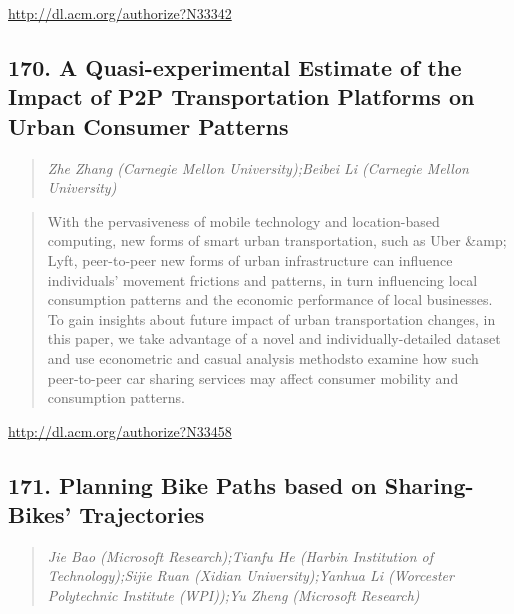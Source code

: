 \documentclass{article}
\begin{document}
\href{http://dl.acm.org/authorize?N33342}{http://dl.acm.org/authorize?N33342}

\subsection{170. A Quasi-experimental Estimate of the Impact of P2P Transportation Platforms on Urban Consumer Patterns}

\begin{quote}
\footnotesize{\textit{Zhe Zhang (Carnegie Mellon University);Beibei Li (Carnegie Mellon University)}}

\end{quote}

\begin{quote}
With the pervasiveness of mobile technology and location-based computing, new forms of smart urban transportation, such as Uber \&amp; Lyft, peer-to-peer new forms of urban infrastructure can influence individuals’ movement frictions and patterns, in turn influencing local consumption patterns and the economic performance of local businesses. To gain insights about future impact of urban transportation changes, in this paper, we take advantage of a novel and individually-detailed dataset and use econometric and casual analysis methodsto examine how such peer-to-peer car sharing services may affect consumer mobility and consumption patterns.
\end{quote}

\href{http://dl.acm.org/authorize?N33458}{http://dl.acm.org/authorize?N33458}

\subsection{171. Planning Bike Paths based on Sharing-Bikes' Trajectories}

\begin{quote}
\footnotesize{\textit{Jie Bao (Microsoft Research);Tianfu He (Harbin Institution of Technology);Sijie Ruan (Xidian University);Yanhua Li (Worcester Polytechnic Institute (WPI));Yu Zheng (Microsoft Research)}}

\end{quote}
\end{document}
